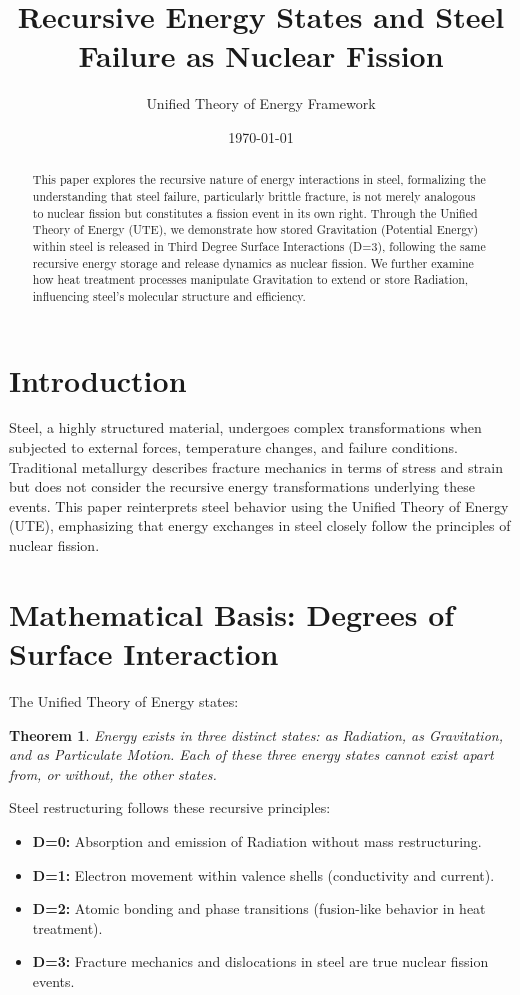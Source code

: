 \documentclass[letterpaper,12pt]{article}
\title{Recursive Energy States and Steel Failure as Nuclear Fission}
\author{Unified Theory of Energy Framework}
\date{\today}
\newtheorem{theorem}{Theorem} %
\begin{document}
\maketitle

\begin{abstract}
This paper explores the recursive nature of energy interactions in steel, formalizing the understanding that steel failure, particularly brittle fracture, is not merely analogous to nuclear fission but constitutes a fission event in its own right. Through the Unified Theory of Energy (UTE), we demonstrate how stored Gravitation (Potential Energy) within steel is released in Third Degree Surface Interactions (D=3), following the same recursive energy storage and release dynamics as nuclear fission. We further examine how heat treatment processes manipulate Gravitation to extend or store Radiation, influencing steel's molecular structure and efficiency.
\end{abstract}

\section{Introduction}
Steel, a highly structured material, undergoes complex transformations when subjected to external forces, temperature changes, and failure conditions. Traditional metallurgy describes fracture mechanics in terms of stress and strain but does not consider the recursive energy transformations underlying these events. This paper reinterprets steel behavior using the Unified Theory of Energy (UTE), emphasizing that energy exchanges in steel closely follow the principles of nuclear fission.

\section{Mathematical Basis: Degrees of Surface Interaction}

The Unified Theory of Energy states:
\begin{theorem}
Energy exists in three distinct states: as Radiation, as Gravitation, and as Particulate Motion. Each of these three energy states cannot exist apart from, or without, the other states.
\end{theorem}

Steel restructuring follows these recursive principles:
\begin{itemize}
    \item \textbf{D=0:} Absorption and emission of Radiation without mass restructuring.
    \item \textbf{D=1:} Electron movement within valence shells (conductivity and current).
    \item \textbf{D=2:} Atomic bonding and phase transitions (fusion-like behavior in heat treatment).
    \item \textbf{D=3:} Fracture mechanics and dislocations in steel are true nuclear fission events.
\end{itemize}
\end{document}
